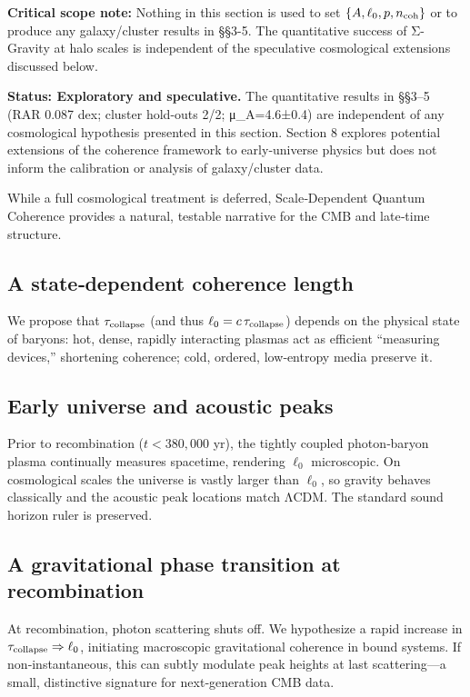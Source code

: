 \documentclass[11pt,a4paper]{article}
\begin{document}
\textbf{Critical scope note:} Nothing in this section is used to set $\{A, \ell_0, p, n_{\rm coh}\}$ or to produce any galaxy/cluster results in §§3-5. The quantitative success of Σ-Gravity at halo scales is independent of the speculative cosmological extensions discussed below.


\textbf{Status: Exploratory and speculative.} The quantitative results in §§3–5 (RAR 0.087 dex; cluster hold-outs 2/2; μ\_A=4.6±0.4) are independent of any cosmological hypothesis presented in this section. Section 8 explores potential extensions of the coherence framework to early‑universe physics but does not inform the calibration or analysis of galaxy/cluster data.


While a full cosmological treatment is deferred, Scale‑Dependent Quantum Coherence provides a natural, testable narrative for the CMB and late‑time structure.


\subsection{A state‑dependent coherence length}


We propose that $\tau_{\rm collapse}$ (and thus $\ell_0=c\,\tau_{\rm collapse}$) depends on the physical state of baryons: hot, dense, rapidly interacting plasmas act as efficient “measuring devices,” shortening coherence; cold, ordered, low‑entropy media preserve it.


\subsection{Early universe and acoustic peaks}


Prior to recombination ($t<380{,}000$ yr), the tightly coupled photon‑baryon plasma continually measures spacetime, rendering $\ell_0$ microscopic. On cosmological scales the universe is vastly larger than $\ell_0$, so gravity behaves classically and the acoustic peak locations match ΛCDM. The standard sound horizon ruler is preserved.


\subsection{A gravitational phase transition at recombination}


At recombination, photon scattering shuts off. We hypothesize a rapid increase in $\tau_{\rm collapse}\Rightarrow\ell_0$, initiating macroscopic gravitational coherence in bound systems. If non‑instantaneous, this can subtly modulate peak heights at last scattering—a small, distinctive signature for next‑generation CMB data.
\end{document}
